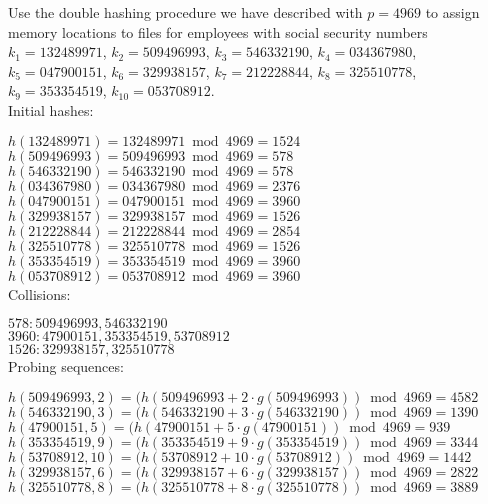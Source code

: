 \documentclass[11pt]{article}
\begin{document}
\begin{enumerate}[label=\textbf{\arabic*.}]
	Use the double hashing procedure we have described with $p = 4969$ to assign memory locations to files for employees with social security numbers $k_1 = 132489971$, $k_2 = 509496993$, $k_3 = 546332190$, $k_4 = 034367980$, $k_5 = 047900151$, $k_6 = 329938157$, $k_7 = 212228844$, $k_8 = 325510778$, $k_9 = 353354519$, $k_{10} = 053708912$. \\
	
	Initial hashes:
	
	$h(132489971) = 132489971 \bmod 4969 = 1524$ \\
	$h(509496993) = 509496993 \bmod 4969 = 578$ \\
	$h(546332190) = 546332190 \bmod 4969 = 578$ \\
	$h(034367980) = 034367980 \bmod 4969 = 2376$ \\
	$h(047900151) = 047900151 \bmod 4969 = 3960$ \\
	$h(329938157) = 329938157 \bmod 4969 = 1526$ \\
	$h(212228844) = 212228844 \bmod 4969 = 2854$ \\
	$h(325510778) = 325510778 \bmod 4969 = 1526$ \\
	$h(353354519) = 353354519 \bmod 4969 = 3960$ \\
	$h(053708912) = 053708912 \bmod 4969 = 3960$ \\
	
	Collisions:
	
	$578: 509496993, 546332190$ \\
	$3960: 47900151, 353354519, 53708912$ \\
	$1526: 329938157, 325510778$ \\
	
	Probing sequences:
	
	$h(509496993, 2) = (h(509496993 + 2 \cdot g(509496993)) \bmod 4969 = 4582$ \\
	$h(546332190, 3) = (h(546332190 + 3 \cdot g(546332190)) \bmod 4969 = 1390$ \\
	$h(47900151, 5) = (h(47900151 + 5 \cdot g(47900151)) \bmod 4969 = 939$ \\
	$h(353354519, 9) = (h(353354519 + 9 \cdot g(353354519)) \bmod 4969 = 3344$ \\
	$h(53708912, 10) = (h(53708912 + 10 \cdot g(53708912)) \bmod 4969 = 1442$ \\
	$h(329938157, 6) = (h(329938157 + 6 \cdot g(329938157)) \bmod 4969 = 2822$ \\
	$h(325510778, 8) = (h(325510778 + 8 \cdot g(325510778)) \bmod 4969 = 3889$
	

\end{enumerate}
\end{document}
